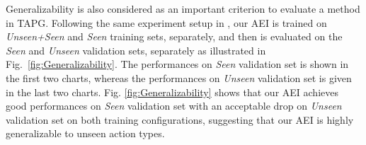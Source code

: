 \documentclass{bmvc2k}
\begin{document}
\begin{table}[t]
\centering
\caption{\textbf{TAD} comparisons on \textbf{ActivityNet-1.3} in terms of mAP@tIoU and mAP, where the proposals are combined with video-level classification results generated by \cite{action_protocol}.}
\vspace*{0.2cm}
\label{activitynet_detection}
\end{table}



Generalizability is also considered as an important criterion to evaluate a method in TAPG. 
Following the same experiment setup in \cite{bmn, dbg}, our AEI is trained on \textit{Unseen+Seen} and \textit{Seen} training sets, separately, and then is evaluated on the \textit{Seen} and \textit{Unseen} validation sets, separately as illustrated in Fig.~\ref{fig:Generalizability}. The performances on \textit{Seen} validation set is shown in the first two charts, whereas the performances on \textit{Unseen} validation set is given in the last two charts.
Fig. \ref{fig:Generalizability} shows that our AEI achieves good performances on \textit{Seen} validation set with an acceptable drop on \textit{Unseen} validation set on both training configurations, suggesting that our AEI is highly generalizable to unseen action types.
\end{document}
